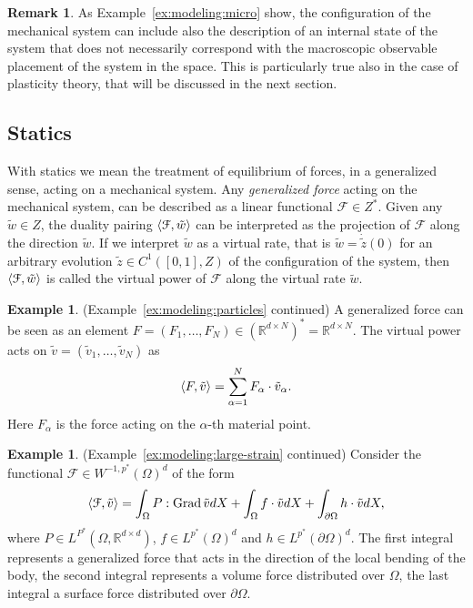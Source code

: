\documentclass[a4paper,10pt,oneside]{amsbook}
\numberwithin{section}{chapter}
\numberwithin{equation}{chapter}
\theoremstyle{definition}
\newtheorem{rmk}[prop]{Remark}
\newtheorem{ex}[prop]{Example}
\DeclareMathOperator{\Grad}{Grad}
\DeclarePairedDelimiter{\dual}{\langle}{\rangle}
\begin{document}
\begin{rmk}
As Example~\ref{ex:modeling:micro} show, the configuration of the mechanical system can include also the description of an internal state of the system that does not necessarily correspond with the macroscopic observable placement of the system in the space. This is particularly true also in the case of plasticity theory, that will be discussed in the next section.
\end{rmk}

\subsection{Statics} With statics we mean the treatment of equilibrium of forces, in a generalized sense, acting on a mechanical system. Any \emph{generalized force} acting on the mechanical system, can be described as a linear functional $\mathcal{F}\in Z^*$. Given any $\tilde w\in Z$, the duality pairing $\dual{\mathcal{F},\tilde w}$ can be interpreted as the projection of $\mathcal{F}$ along the direction $\tilde w$. If we interpret $\tilde w$ as a virtual rate, that is $\tilde w=\dot{\tilde z}(0)$ for an arbitrary evolution $\tilde{z}\in C^1([0,1],Z)$ of the configuration of the system, then $\dual{\mathcal{F},\tilde w}$ is called the virtual power of $\mathcal{F}$ along the virtual rate $\tilde{w}$.
\begin{ex}(Example~\ref{ex:modeling:particles} continued)
\label{ex:modeling:particles-continued}
A generalized force can be seen as an element $F=(F_1,\dots,F_N)\in(\mathbb{R}^{d\times N})^*=\mathbb{R}^{d\times N}$. The virtual power acts on $\tilde v=(\tilde v_1,\dots,\tilde v_N)$ as
\[
\dual{F,\tilde v}=\sum_{\alpha=1}^NF_\alpha\cdot\tilde v_\alpha.
\]
Here $F_\alpha$ is the force acting on the $\alpha$-th material point.
\end{ex}
\begin{ex}(Example~\ref{ex:modeling:large-strain} continued)
Consider the functional $\mathcal{F}\in W^{-1,p^*}(\Omega)^d$ of the form
\[
\dual{\mathcal{F},\tilde v}=\int_\Omega P:\Grad\tilde vdX+\int_\Omega f\cdot\tilde vdX+\int_{\partial\Omega}h\cdot\tilde vdX,
\]
where $P\in L^{P^*}(\Omega,\mathbb{R}^{d\times d})$, $f\in L^{p^*}(\Omega)^d$ and $h\in L^{p^*}(\partial\Omega)^d$. The first integral represents a generalized force that acts in the direction of the local bending of the body, the second integral represents a volume force distributed over $\Omega$, the last integral a surface force distributed over $\partial\Omega$.
\end{ex}
\end{document}
